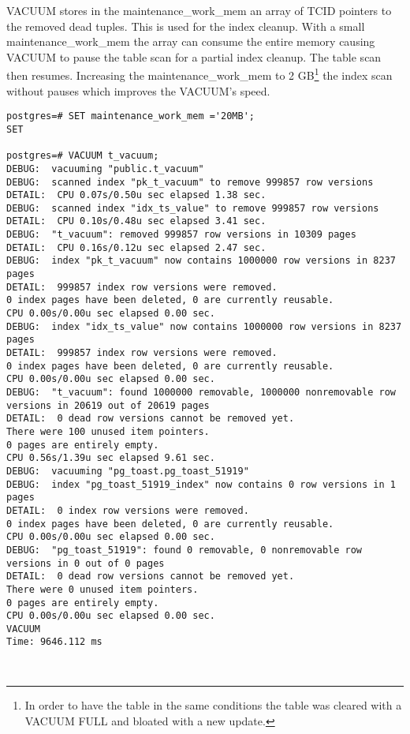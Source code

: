 VACUUM stores in the maintenance\_work\_mem an array of TCID pointers to the removed dead tuples. This
is used for the index cleanup. With a small maintenance\_work\_mem the array can consume the entire
memory causing VACUUM to pause the table scan for a partial index cleanup. The table scan then resumes.
Increasing the maintenance\_work\_mem to 2 GB\footnote{In order to have the table in the same conditions the
table was cleared with a VACUUM FULL and bloated with a new update.} the index scan without pauses
which improves the VACUUM's speed.\newline

\begin{lstlisting}[style=pgsql]
postgres=# SET maintenance_work_mem ='20MB';
SET

postgres=# VACUUM t_vacuum;
DEBUG:  vacuuming "public.t_vacuum"
DEBUG:  scanned index "pk_t_vacuum" to remove 999857 row versions
DETAIL:  CPU 0.07s/0.50u sec elapsed 1.38 sec.
DEBUG:  scanned index "idx_ts_value" to remove 999857 row versions
DETAIL:  CPU 0.10s/0.48u sec elapsed 3.41 sec.
DEBUG:  "t_vacuum": removed 999857 row versions in 10309 pages
DETAIL:  CPU 0.16s/0.12u sec elapsed 2.47 sec.
DEBUG:  index "pk_t_vacuum" now contains 1000000 row versions in 8237 pages
DETAIL:  999857 index row versions were removed.
0 index pages have been deleted, 0 are currently reusable.
CPU 0.00s/0.00u sec elapsed 0.00 sec.
DEBUG:  index "idx_ts_value" now contains 1000000 row versions in 8237 pages
DETAIL:  999857 index row versions were removed.
0 index pages have been deleted, 0 are currently reusable.
CPU 0.00s/0.00u sec elapsed 0.00 sec.
DEBUG:  "t_vacuum": found 1000000 removable, 1000000 nonremovable row versions in 20619 out of 20619 pages
DETAIL:  0 dead row versions cannot be removed yet.
There were 100 unused item pointers.
0 pages are entirely empty.
CPU 0.56s/1.39u sec elapsed 9.61 sec.
DEBUG:  vacuuming "pg_toast.pg_toast_51919"
DEBUG:  index "pg_toast_51919_index" now contains 0 row versions in 1 pages
DETAIL:  0 index row versions were removed.
0 index pages have been deleted, 0 are currently reusable.
CPU 0.00s/0.00u sec elapsed 0.00 sec.
DEBUG:  "pg_toast_51919": found 0 removable, 0 nonremovable row versions in 0 out of 0 pages
DETAIL:  0 dead row versions cannot be removed yet.
There were 0 unused item pointers.
0 pages are entirely empty.
CPU 0.00s/0.00u sec elapsed 0.00 sec.
VACUUM
Time: 9646.112 ms



\end{lstlisting}


